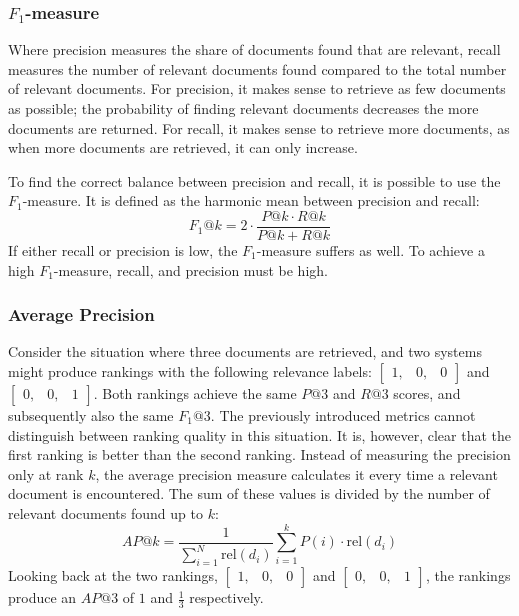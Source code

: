 \subsubsection{$F_1$-measure}
Where precision measures the share of documents found that are relevant, recall measures the number of relevant documents found compared to the total number of relevant documents. For precision, it makes sense to retrieve as few documents as possible; the probability of finding relevant documents decreases the more documents are returned. For recall, it makes sense to retrieve more documents, as when more documents are retrieved, it can only increase.  

To find the correct balance between precision and recall, it is possible to use the $F_1$-measure. It is defined as the harmonic mean between precision and recall:
\begin{equation}
	\textit{F}_1@\textit{k}  = 2\cdot\frac{P@k \cdot R@k}{P@k + R@k} 
\end{equation}
If either recall or precision is low, the $F_1$-measure suffers as well. To achieve a high $F_1$-measure, recall, and precision must be high.

\subsubsection{Average Precision}
Consider the situation where three documents are retrieved, and two systems might produce rankings with the following relevance labels: $\left[
\begin{smallmatrix}
	1, & 0, & 0
\end{smallmatrix}
\right]$ and $\left[
\begin{smallmatrix}
	0, & 0, & 1
\end{smallmatrix}
\right]$.
Both rankings achieve the same $P@3$ and $R@3$ scores, and subsequently also the same $F_1@3$. The previously introduced metrics cannot distinguish between ranking quality in this situation. It is, however, clear that the first ranking is better than the second ranking. 
Instead of measuring the precision only at rank $k$, the average precision measure calculates it every time a relevant document is encountered. The sum of these values is divided by the number of relevant documents found up to $k$:
\begin{equation}
	\textit{AP}@k = \frac{1}{\sum_{i=1}^N\text{rel}\left(d_i\right)}\sum^k_{i=1} P\left(i\right) \cdot \text{rel}\left(d_i\right)
\end{equation}
Looking back at the two rankings, 
$\left[
\begin{smallmatrix}
	1, & 0, & 0
\end{smallmatrix}
\right]$ and $\left[
\begin{smallmatrix}
	0, & 0, & 1
\end{smallmatrix}
\right]$, the rankings produce an $\textit{AP}@3$ of $1$ and $\frac{1}{3}$ respectively.


